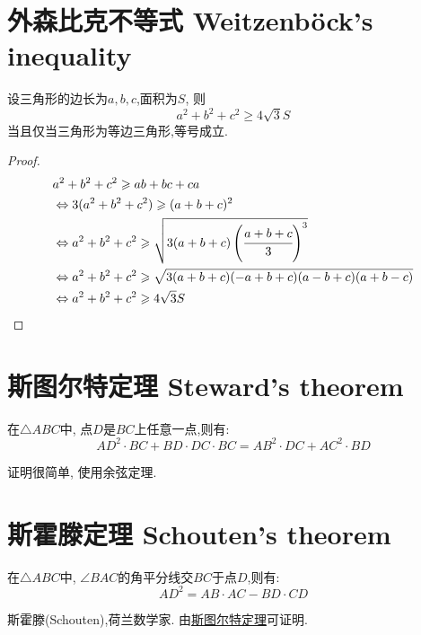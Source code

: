 \section{外森比克不等式 Weitzenböck's inequality}

\begin{theorem}
设三角形的边长为$a,b,c$,面积为$S$, 则
\[a^2+b^2+c^2 \geqslant 4\sqrt{3}S\]
当且仅当三角形为等边三角形,等号成立.
\end{theorem}

\begin{proof}
\begin{align*}
  & a^2+b^2+c^2 \geqslant ab+ bc + ca \\
  &\Leftrightarrow 3(a^2+b^2+c^2) \geqslant (a+b+c)^2 \\
  &\Leftrightarrow a^2+b^2+c^2 \geqslant \sqrt{3(a+b+c)\left(\cfrac{a+b+c}{3}\right)^3} \\
  &\Leftrightarrow a^2+b^2+c^2 \geqslant \sqrt{3(a+b+c)(-a+b+c)(a-b+c)(a+b-c)} \\
  &\Leftrightarrow a^2+b^2+c^2 \geqslant 4\sqrt{3}S
\end{align*}
\end{proof}

\section{斯图尔特定理 Steward's theorem}

\begin{theorem}
  在$\triangle ABC$中, 点$D$是$BC$上任意一点,则有:
  \[AD^2 \cdot BC + BD \cdot DC \cdot BC =
    AB^2 \cdot DC + AC^2 \cdot BD \]
\end{theorem}

证明很简单, 使用余弦定理.

\section{斯霍滕定理 Schouten's theorem}

\begin{theorem}
  在$\triangle ABC$中, $\angle BAC$的角平分线交$BC$于点$D$,则有:
  \[AD^2  = AB \cdot AC - BD \cdot CD \]
\end{theorem}

斯霍滕(Schouten),荷兰数学家. 由\hyperref[steward]{斯图尔特定理}可证明.